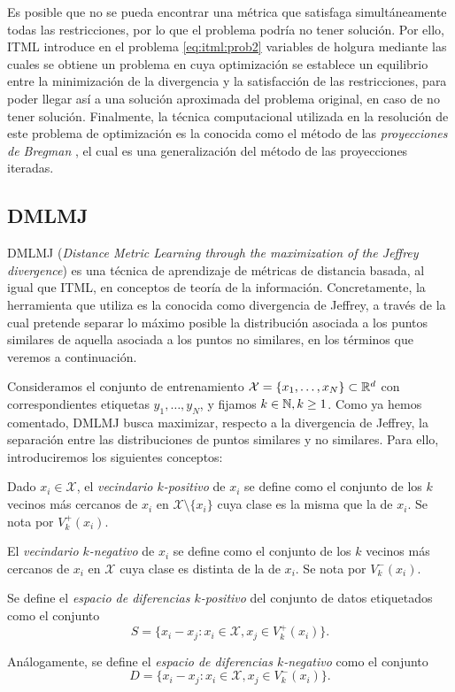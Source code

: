 Es posible que no se pueda encontrar una métrica que satisfaga simultáneamente todas las restricciones, por lo que el problema podría no tener solución. Por ello, ITML introduce en el problema \ref{eq:itml:prob2} variables de holgura mediante las cuales se obtiene un problema en cuya optimización se establece un equilibrio entre la minimización de la divergencia y la satisfacción de las restricciones, para poder llegar así a una solución aproximada del problema original, en caso de no tener solución. Finalmente, la técnica computacional utilizada en la resolución de este problema de optimización es la conocida como el método de las \emph{proyecciones de Bregman} \cite{bregman_projections}, el cual es una generalización del método de las proyecciones iteradas.

\subsection{DMLMJ}

DMLMJ (\emph{Distance Metric Learning through the maximization of the Jeffrey divergence}) \cite{dmlmj} es una técnica de aprendizaje de métricas de distancia basada, al igual que ITML, en conceptos de teoría de la información. Concretamente, la herramienta que utiliza es la conocida como divergencia de Jeffrey, a través de la cual pretende separar lo máximo posible la distribución asociada a los puntos similares de aquella asociada a los puntos no similares, en los términos que veremos a continuación.

Consideramos el conjunto de entrenamiento $\mathcal{X} = \{x_1,\dots,x_N\} \subset \mathbb{R}^d$ con correspondientes etiquetas $y_1,\dots,y_N$, y fijamos $k \in \mathbb{N}, k \ge 1$. Como ya hemos comentado, DMLMJ busca maximizar, respecto a la divergencia de Jeffrey, la separación entre las distribuciones de puntos similares y no similares. Para ello, introduciremos los siguientes conceptos:

\begin{definition}
    Dado $x_i \in \mathcal{X}$, el \emph{vecindario $k$-positivo} de $x_i$ se define como el conjunto de los $k$ vecinos más cercanos de $x_i$ en $\mathcal{X} \setminus \{x_i\}$ cuya clase es la misma que la de $x_i$. Se nota por $V_k^+(x_i)$.

    El \emph{vecindario $k$-negativo} de $x_i$ se define como el conjunto de los $k$ vecinos más cercanos de $x_i$ en $\mathcal{X}$ cuya clase es distinta de la de $x_i$. Se nota por $V_k^-(x_i)$.

    Se define el \emph{espacio de diferencias $k$-positivo} del conjunto de datos etiquetados como el conjunto 
    \[ S = \{x_i - x_j \colon x_i \in \mathcal{X}, x_j \in V_k^+(x_i)\}. \]

    Análogamente, se define el \emph{espacio de diferencias $k$-negativo} como el conjunto
    \[ D = \{x_i - x_j \colon x_i \in \mathcal{X}, x_j \in V_k^-(x_i)\}. \]

\end{definition}

